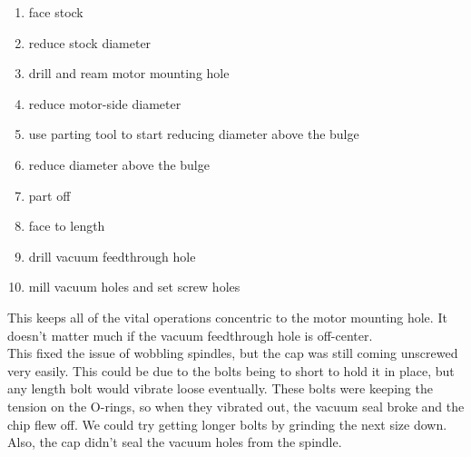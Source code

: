 \documentclass[12pt]{report}
\begin{document}
\begin{enumerate}
\item face stock
\item reduce stock diameter
\item drill and ream motor mounting hole
\item reduce motor-side diameter
\item use parting tool to start reducing diameter above the bulge
\item reduce diameter above the bulge
\item part off
\item face to length
\item drill vacuum feedthrough hole
\item mill vacuum holes and set screw holes
\end{enumerate}

This keeps all of the vital operations concentric to the motor mounting hole. It doesn't matter much if the vacuum feedthrough hole is off-center. \\
This fixed the issue of wobbling spindles, but the cap was still coming unscrewed very easily. This could be due to the bolts being to short to hold it in place, but any length bolt would vibrate loose eventually. These bolts were keeping the tension on the O-rings, so when they vibrated out, the vacuum seal broke and the chip flew off. We could try getting longer bolts by grinding the next size down. Also, the cap didn't seal the vacuum holes from the spindle.
\end{document}
